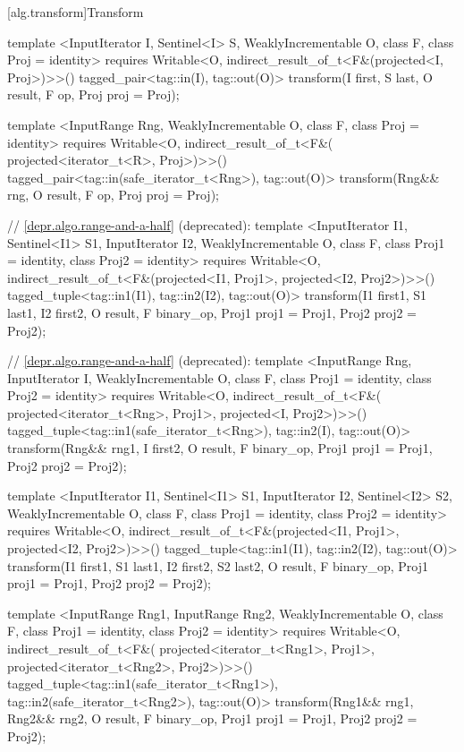 [alg.transform]{Transform}

%
\begin{itemdecl}
template <InputIterator I, Sentinel<I> S, WeaklyIncrementable O, class F, class Proj = identity>
  requires Writable<O, indirect_result_of_t<F&(projected<I, Proj>)>>()
  tagged_pair<tag::in(I), tag::out(O)>
    transform(I first, S last, O result, F op, Proj proj = Proj{});

template <InputRange Rng, WeaklyIncrementable O, class F, class Proj = identity>
  requires Writable<O, indirect_result_of_t<F&(
    projected<iterator_t<R>, Proj>)>>()
  tagged_pair<tag::in(safe_iterator_t<Rng>), tag::out(O)>
    transform(Rng&& rng, O result, F op, Proj proj = Proj{});

// \ref{depr.algo.range-and-a-half} (deprecated):
template <InputIterator I1, Sentinel<I1> S1, InputIterator I2, WeaklyIncrementable O,
    class F, class Proj1 = identity, class Proj2 = identity>
  requires Writable<O, indirect_result_of_t<F&(projected<I1, Proj1>,
    projected<I2, Proj2>)>>()
  tagged_tuple<tag::in1(I1), tag::in2(I2), tag::out(O)>
    transform(I1 first1, S1 last1, I2 first2, O result,
              F binary_op, Proj1 proj1 = Proj1{}, Proj2 proj2 = Proj2{});

// \ref{depr.algo.range-and-a-half} (deprecated):
template <InputRange Rng, InputIterator I, WeaklyIncrementable O, class F,
    class Proj1 = identity, class Proj2 = identity>
  requires Writable<O, indirect_result_of_t<F&(
    projected<iterator_t<Rng>, Proj1>, projected<I, Proj2>)>>()
  tagged_tuple<tag::in1(safe_iterator_t<Rng>), tag::in2(I), tag::out(O)>
    transform(Rng&& rng1, I first2, O result,
              F binary_op, Proj1 proj1 = Proj1{}, Proj2 proj2 = Proj2{});

template <InputIterator I1, Sentinel<I1> S1, InputIterator I2, Sentinel<I2> S2,
    WeaklyIncrementable O, class F, class Proj1 = identity, class Proj2 = identity>
  requires Writable<O, indirect_result_of_t<F&(projected<I1, Proj1>,
    projected<I2, Proj2>)>>()
  tagged_tuple<tag::in1(I1), tag::in2(I2), tag::out(O)>
    transform(I1 first1, S1 last1, I2 first2, S2 last2, O result,
            F binary_op, Proj1 proj1 = Proj1{}, Proj2 proj2 = Proj2{});

template <InputRange Rng1, InputRange Rng2, WeaklyIncrementable O, class F,
    class Proj1 = identity, class Proj2 = identity>
  requires Writable<O, indirect_result_of_t<F&(
    projected<iterator_t<Rng1>, Proj1>, projected<iterator_t<Rng2>, Proj2>)>>()
  tagged_tuple<tag::in1(safe_iterator_t<Rng1>),
               tag::in2(safe_iterator_t<Rng2>),
               tag::out(O)>
    transform(Rng1&& rng1, Rng2&& rng2, O result,
              F binary_op, Proj1 proj1 = Proj1{}, Proj2 proj2 = Proj2{});
\end{itemdecl}

